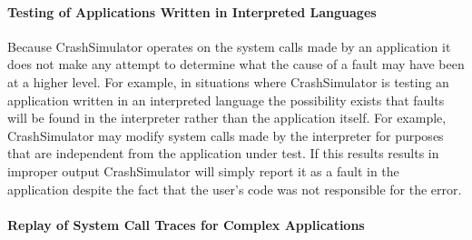         \paragraph{Testing of Applications Written in Interpreted Languages}

            Because CrashSimulator operates on the system calls made by an application it does not make any attempt to
            determine what the cause of a fault may have been at a higher level. For example, in situations where
            CrashSimulator is testing an application written in an interpreted language the possibility exists that
            faults will be found in the interpreter rather than the application itself. For example, CrashSimulator may
            modify system calls made by the interpreter for purposes that are independent from the application under
            test.  If this results results in improper output CrashSimulator will simply report it as a fault in the
            application despite the fact that the user's code was not responsible for the error.

        \paragraph{Replay of System Call Traces for Complex Applications}


